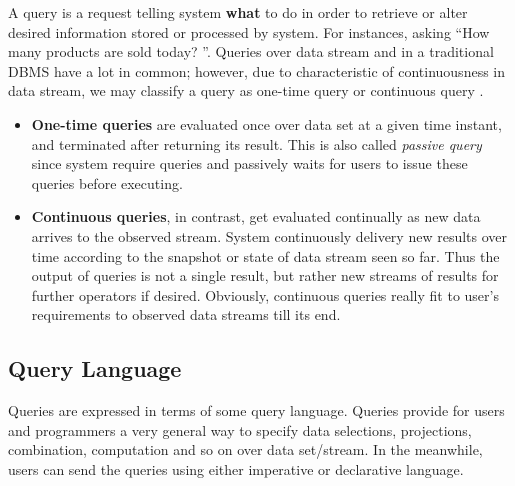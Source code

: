 A query is a request telling system \textbf{what} to do in order to retrieve or alter desired information stored or processed by system. For instances, asking ``How many products are sold today? ''. Queries over data stream and in a traditional DBMS have a lot in common; however, due to characteristic of continuousness in data stream, we may classify a query as one-time query or continuous query \citep{Terry:1992} \citep{Babcock:2002}. 
\begin{itemize}
	\item \textbf{One-time queries} are evaluated once over data set at a given time instant, and terminated after returning its result. This is also called \textit{passive query} \citep{SmartVotex:2011} since system require queries and passively waits for users to issue these queries before executing. 
	\item \textbf{Continuous queries}, in contrast, get evaluated continually as new data arrives to the observed stream. System continuously delivery new results  over time according to the snapshot or state of data stream seen so far. Thus the output of queries is not a single result, but rather new streams of results for further operators if desired. Obviously, continuous queries really fit to user's requirements to observed data streams till its end. 
\end{itemize}



\subsection*{Query Language}
Queries are expressed in terms of some query language. Queries provide for users and programmers a very general way to specify data selections, projections, combination, computation and so on over data set/stream. In the meanwhile, users can send the queries using either imperative or declarative language.

